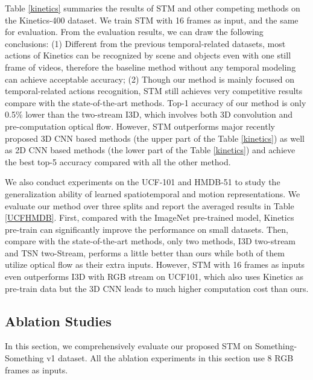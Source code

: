 \documentclass[10pt,twocolumn,letterpaper]{article}
\begin{document}
	Table \ref{kinetics} summaries the results of STM and other competing methods on the Kinetics-400 dataset. We train STM with 16 frames as input, and the same for evaluation. From the evaluation results, we can draw the following conclusions: (1) Different from the previous temporal-related datasets, most actions of Kinetics can be recognized by scene and objects even with one still frame of videos, therefore the baseline method without any temporal modeling can achieve acceptable accuracy; (2) Though our method is mainly focused on temporal-related actions recognition, STM still achieves very competitive results compare with the state-of-the-art methods. Top-1 accuracy of our method is only 0.5\% lower than the two-stream I3D, which involves both 3D convolution and pre-computation optical flow. However, STM outperforms major recently proposed 3D CNN based methods (the upper part of the Table \ref{kinetics}) as well as 2D CNN based methods (the lower part of the Table \ref{kinetics}) and achieve the best top-5 accuracy compared with all the other method.


	We also conduct experiments on the UCF-101 and HMDB-51 to study the generalization ability of learned spatiotemporal and motion representations. We evaluate our method over three splits and report the averaged results in Table \ref{UCFHMDB}. First, compared with the ImageNet pre-trained model, Kinetics pre-train can significantly improve the performance on small datasets. Then, compare with the state-of-the-art methods, only two methods,  I3D two-stream and TSN two-Stream, performs a little better than ours while both of them utilize optical flow as their extra inputs. However, STM with 16 frames as inputs even outperforms I3D with RGB stream on UCF101, which also uses Kinetics as pre-train data but the 3D CNN leads to much higher computation cost than ours.
	
\subsection{Ablation Studies}
In this section, we comprehensively evaluate our proposed STM on Something-Something v1 dataset. All the ablation experiments in this section use 8 RGB frames as inputs.
\end{document}
